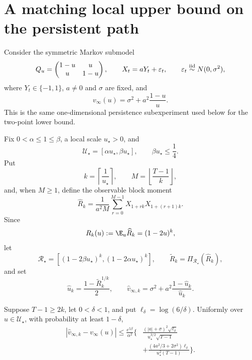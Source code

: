 \section{A matching local upper bound on the persistent path}
\label{sec:persistence-upper-bound}

Consider the symmetric Markov submodel
\[
 Q_u=\begin{pmatrix}1-u&u\\u&1-u\end{pmatrix},
 \qquad
 X_t=aY_t+\varepsilon_t,
 \qquad
 \varepsilon_t\stackrel{\rm iid}{\sim}N(0,\sigma^2),
\]
where \(Y_t\in\{-1,1\}\), \(a\ne0\) and \(\sigma\) are fixed, and
\[
 v_\infty(u)=\sigma^2+a^2\frac{1-u}{u}.
\]
This is the same one-dimensional persistence subexperiment used below for the
two-point lower bound.

Fix \(0<\alpha\leq1\leq\beta\), a local scale \(u_\star>0\), and
\begin{equation}
 \mathcal U_\star=[\alpha u_\star,\beta u_\star],
 \qquad \beta u_\star\leq\frac14.
 \label{eq:upper-local-cell}
\end{equation}
Put
\[
 k=\left\lceil\frac1{u_\star}\right\rceil,
 \qquad
 M=\left\lfloor\frac{T-1}{k}\right\rfloor,
\]
and, when \(M\geq1\), define the observable block moment
\begin{equation}
 \widehat R_k
 =\frac1{a^2M}
 \sum_{r=0}^{M-1}
 X_{1+rk}X_{1+(r+1)k}.
 \label{eq:upper-long-lag-moment}
\end{equation}
Since
\[
 R_k(u):=\E_u\widehat R_k=(1-2u)^k,
\]
let
\[
 \mathcal R_\star=
 \left[(1-2\beta u_\star)^k,
       (1-2\alpha u_\star)^k\right],
 \qquad
 \widetilde R_k=\Pi_{\mathcal R_\star}(\widehat R_k),
\]
and set
\begin{equation}
 \widehat u_k=\frac{1-\widetilde R_k^{1/k}}2,
 \qquad
 \widehat v_{\infty,k}
 =\sigma^2+a^2\frac{1-\widehat u_k}{\widehat u_k}.
 \label{eq:upper-long-lag-plugin}
\end{equation}

\begin{theorem}
\label{thm:persistence-local-upper}
Suppose \(T-1\geq2k\), let \(0<\delta<1\), and put
\(\ell_\delta=\log(6/\delta)\).  Uniformly over
\(u\in\mathcal U_\star\), with probability at least \(1-\delta\),
\begin{align}
 |\widehat v_{\infty,k}-v_\infty(u)|
 \leq\frac{e^{5\beta}}{\alpha^2}
 \Bigg\{
 &\frac{(|a|+\sigma)^2\sqrt{\ell_\delta}}
 {u_\star^{3/2}\sqrt{T-1}}
 \nonumber\\
 &+\frac{(4a^2/3+2\sigma^2)\ell_\delta}
 {u_\star^2(T-1)}
 \Bigg\}.
 \label{eq:persistence-local-upper}
\end{align}
\end{theorem}

